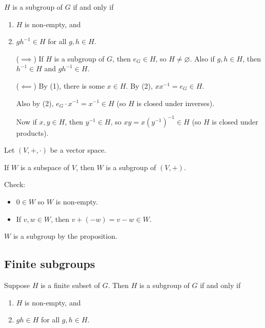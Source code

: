 \documentclass[12pt,letterpaper]{report}
\begin{document}
\begin{prop}{}{}
  $H$ is a subgroup of $G$ if and only if
  \begin{enumerate}
    \item $H$ is non-empty, and
    \item $gh^{-1} \in H$ for all $g, h \in H$.
  \end{enumerate}
\end{prop}

\begin{thmproof}
  \begin{enumerate}[leftmargin=4em]
    \item[($\implies$)]
    If $H$ is a subgroup of $G$, then $e_G \in H$, so $H \neq \varnothing$.
    Also if $g, h \in H$, then $h^{-1} \in H$ and $gh^{-1} \in H$.
    \item[($\impliedby$)]
    By (1), there is some $x \in H$.
    By (2), $xx^{-1} = e_G \in H$.

    Also by (2), $e_G \cdot x^{-1} = x^{-1} \in H$ (so $H$ is closed under inverses).

    Now if $x, y \in H$, then $y^{-1} \in H$, so $xy = x(y^{-1})^{-1} \in H$ (so $H$ is closed under
    products).
  \end{enumerate}
\end{thmproof}

\begin{ex}
  Let $(V, +, \cdot)$ be a vector space.

  If $W$ is a subspace of $V$, then $W$ is a subgroup of $(V, +)$.

  Check:
  \begin{itemize}
    \item $0 \in W$ so $W$ is non-empty.
    \item If $v, w \in W$, then $v + (-w) = v - w \in W$.
  \end{itemize}
  $W$ is a subgroup by the proposition.
\end{ex}

\pagebreak
\subsection{Finite subgroups}

\begin{prop}{}{}
  Suppose $H$ is a finite subset of $G$.
  Then $H$ is a subgroup of $G$ if and only if
  \begin{enumerate}
    \item $H$ is non-empty, and
    \item $gh \in H$ for all $g, h \in H$.
  \end{enumerate}
\end{prop}
\end{document}
